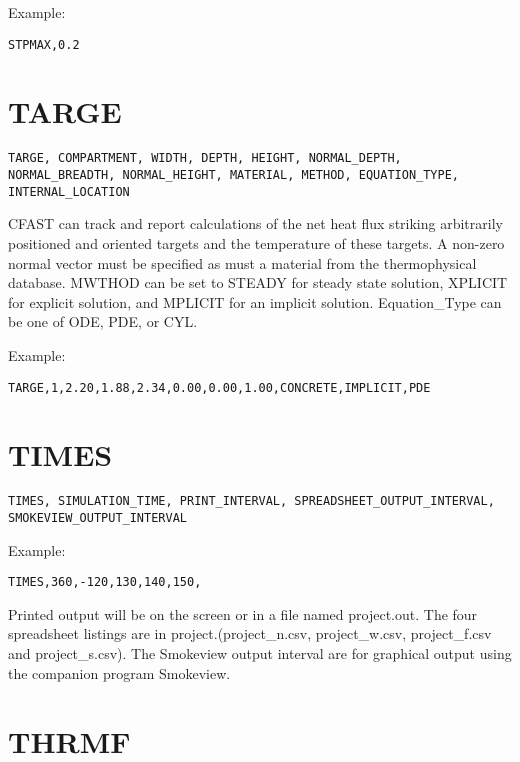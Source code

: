 Example:

\begin{lstlisting}
STPMAX,0.2
\end{lstlisting}

\section{TARGE}

\begin{lstlisting}
TARGE, COMPARTMENT, WIDTH, DEPTH, HEIGHT, NORMAL_DEPTH, NORMAL_BREADTH, NORMAL_HEIGHT, MATERIAL, METHOD, EQUATION_TYPE, INTERNAL_LOCATION
\end{lstlisting}

CFAST can track and report calculations of the net heat flux striking arbitrarily positioned and oriented targets and the temperature of these targets. A non-zero normal vector must be specified as must a material from the thermophysical database. MWTHOD can be set to STEADY for steady state solution, XPLICIT for explicit solution, and MPLICIT for an implicit solution. Equation\_Type can be one of ODE, PDE, or CYL.

Example:

\begin{lstlisting}
TARGE,1,2.20,1.88,2.34,0.00,0.00,1.00,CONCRETE,IMPLICIT,PDE
\end{lstlisting}

\section{TIMES}

\begin{lstlisting}
TIMES, SIMULATION_TIME, PRINT_INTERVAL, SPREADSHEET_OUTPUT_INTERVAL, SMOKEVIEW_OUTPUT_INTERVAL
\end{lstlisting}

Example:

\begin{lstlisting}
TIMES,360,-120,130,140,150,
\end{lstlisting}

Printed output will be on the screen or in a file named project.out. The four spreadsheet listings are in project.(project\_n.csv, project\_w.csv, project\_f.csv and project\_s.csv). The Smokeview output interval are for graphical output using the companion program Smokeview.

\section{THRMF}

